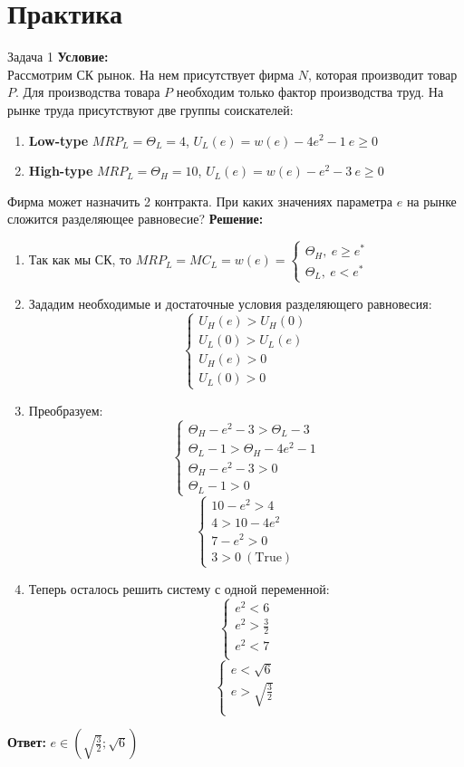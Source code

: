 \section{Практика}
\begin{mybox}{Задача 1}
\textbf{Условие:}\\ Рассмотрим СК рынок. На нем присутствует фирма $N$, которая производит товар $P$. Для производства товара $P$ необходим только фактор производства труд. На рынке труда присутствуют две группы соискателей: \begin{enumerate}
    \item \textbf{Low-type} $MRP_L=\Theta_L=4$, $U_L(e)=w(e)-4e^2-1 \ e\geq0$
    \item \textbf{High-type} $MRP_L=\Theta_H=10$, $U_L(e)=w(e)-e^2-3 \ e\geq0$
\end{enumerate}
Фирма может назначить 2 контракта. При каких значениях параметра $e$ на рынке сложится разделяющее равновесие?
\tcblower
\textbf{Решение:}\\
\begin{enumerate}
    \item Так как мы СК, то $MRP_L=MC_L=w(e)=\begin{cases}
        \Theta_H, \ e\geq e^* \\
        \Theta_L, \ e<e^*
    \end{cases}$
    \item Зададим необходимые и достаточные условия разделяющего равновесия: $$\begin{cases}
        U_H(e)>U_H(0) \\
        U_L(0)>U_L(e) \\
        U_H(e)>0 \\
        U_L(0)>0
    \end{cases}$$
    \item Преобразуем: $$\begin{cases}
        \Theta_H-e^2-3>\Theta_L-3 \\
        \Theta_L-1>\Theta_H-4e^2-1 \\
        \Theta_H-e^2-3>0 \\
        \Theta_L-1>0
    \end{cases}$$
    $$\begin{cases}
        10-e^2>4 \\
        4>10-4e^2 \\
        7-e^2>0 \\
        3>0 \ (\text{True})
    \end{cases}$$
    \item Теперь осталось решить систему с одной переменной: $$\begin{cases}
        e^2<6 \\
        e^2>\frac{3}{2} \\
        e^2<7 \\
    \end{cases}$$
    $$\begin{cases}
        e<\sqrt{6} \\
        e>\sqrt{\frac{3}{2}} \\
    \end{cases}$$
\end{enumerate}
\textbf{Ответ:} $e\in (\sqrt{\frac{3}{2}};\sqrt{6})$


\end{mybox}
